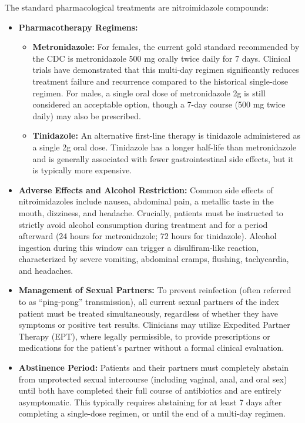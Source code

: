 The standard pharmacological treatments are nitroimidazole compounds:
\begin{itemize}
    \item \textbf{Pharmacotherapy Regimens:}
    \begin{itemize}
        \item \textbf{Metronidazole:} For females, the current gold standard recommended by the CDC is metronidazole 500 mg orally twice daily for 7 days. Clinical trials have demonstrated that this multi-day regimen significantly reduces treatment failure and recurrence compared to the historical single-dose regimen. For males, a single oral dose of metronidazole 2g is still considered an acceptable option, though a 7-day course (500 mg twice daily) may also be prescribed.
        \item \textbf{Tinidazole:} An alternative first-line therapy is tinidazole administered as a single 2g oral dose. Tinidazole has a longer half-life than metronidazole and is generally associated with fewer gastrointestinal side effects, but it is typically more expensive.
    \end{itemize}
    \item \textbf{Adverse Effects and Alcohol Restriction:} Common side effects of nitroimidazoles include nausea, abdominal pain, a metallic taste in the mouth, dizziness, and headache. Crucially, patients must be instructed to strictly avoid alcohol consumption during treatment and for a period afterward (24 hours for metronidazole; 72 hours for tinidazole). Alcohol ingestion during this window can trigger a disulfiram-like reaction, characterized by severe vomiting, abdominal cramps, flushing, tachycardia, and headaches.
    \item \textbf{Management of Sexual Partners:} To prevent reinfection (often referred to as ``ping-pong'' transmission), all current sexual partners of the index patient must be treated simultaneously, regardless of whether they have symptoms or positive test results. Clinicians may utilize Expedited Partner Therapy (EPT), where legally permissible, to provide prescriptions or medications for the patient's partner without a formal clinical evaluation.
    \item \textbf{Abstinence Period:} Patients and their partners must completely abstain from unprotected sexual intercourse (including vaginal, anal, and oral sex) until both have completed their full course of antibiotics and are entirely asymptomatic. This typically requires abstaining for at least 7 days after completing a single-dose regimen, or until the end of a multi-day regimen.

\end{itemize}
